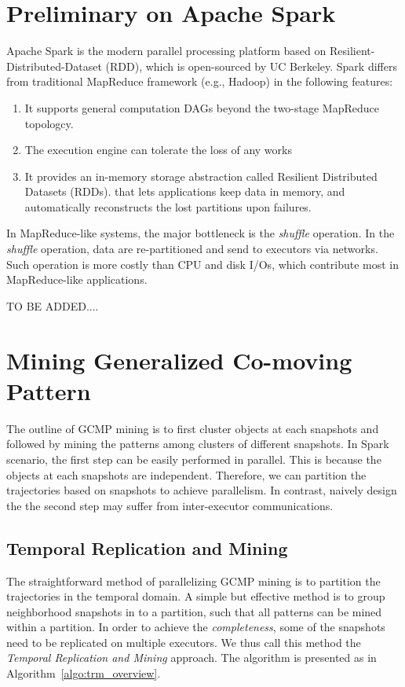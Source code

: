 \section{Preliminary on Apache Spark}
Apache Spark is the modern parallel processing platform
based on Resilient-Distributed-Dataset (RDD), which
is open-sourced by UC Berkeley. Spark differs from
traditional MapReduce framework (e.g., Hadoop) in the 
following features:
\begin{enumerate}
\item{It supports general computation DAGs beyond the two-stage MapReduce topologcy.}
\item{The execution engine can tolerate the loss of any works}
\item{It provides an in-memory storage abstraction called Resilient Distributed Datasets (RDDs). that 
lets applications keep data in memory, and automatically reconstructs the lost partitions upon failures.}
\end{enumerate}

In MapReduce-like systems, the major bottleneck is the \emph{shuffle} operation. 
In the \emph{shuffle} operation, data are re-partitioned and send to executors
via networks. Such operation is more costly than CPU and disk I/Os, which contribute
most in MapReduce-like applications. 

TO BE ADDED....


\section{Mining Generalized Co-moving Pattern}
The outline of GCMP mining is to first cluster objects at
each snapshots and followed by mining the patterns among clusters
of different snapshots. In Spark scenario, 
the first step can be easily performed in parallel. 
This is because the objects at each snapshots are independent. Therefore, we
can partition the trajectories based on snapshots to achieve parallelism. 
In contrast, naively design the 
the second step may suffer from inter-executor communications. 

\subsection{Temporal Replication and Mining}
The straightforward method of parallelizing GCMP mining is to partition
the trajectories in the temporal domain. A simple but effective method
is to group neighborhood snapshots in to a partition, such that all patterns
can be mined within a partition. In order to achieve the \emph{completeness},
some of the snapshots need to be replicated on multiple executors.
We thus call this method the \emph{Temporal Replication and Mining} approach. 
The algorithm is presented as in Algorithm~\ref{algo:trm_overview}.

